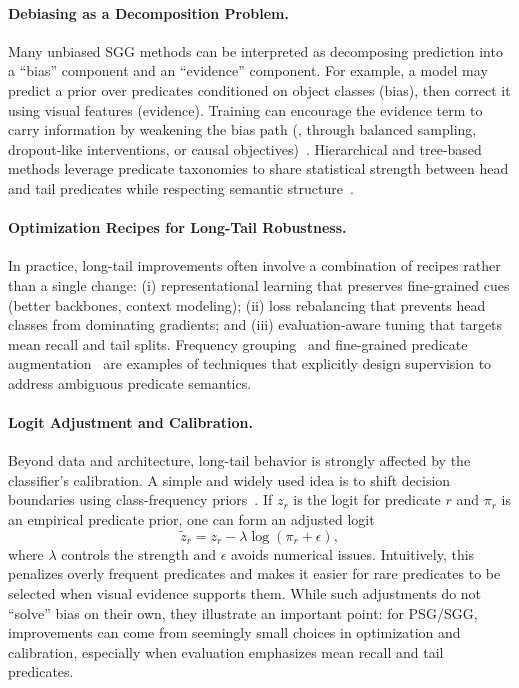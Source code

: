 \paragraph{Debiasing as a Decomposition Problem.}
Many unbiased SGG methods can be interpreted as decomposing prediction into a ``bias'' component and an ``evidence'' component. For example, a model may predict a prior over predicates conditioned on object classes (bias), then correct it using visual features (evidence). Training can encourage the evidence term to carry information by weakening the bias path (\eg, through balanced sampling, dropout-like interventions, or causal objectives)~\citep{tang2020unbiased, li2021bipartite}. Hierarchical and tree-based methods leverage predicate taxonomies to share statistical strength between head and tail predicates while respecting semantic structure~\citep{yu2020cogtree, deng2022hierarchical}.

\paragraph{Optimization Recipes for Long-Tail Robustness.}
In practice, long-tail improvements often involve a combination of recipes rather than a single change: (i) representational learning that preserves fine-grained cues (better backbones, context modeling); (ii) loss rebalancing that prevents head classes from dominating gradients; and (iii) evaluation-aware tuning that targets mean recall and tail splits. Frequency grouping~\citep{dong2022stacked} and fine-grained predicate augmentation~\citep{zhang2022fine} are examples of techniques that explicitly design supervision to address ambiguous predicate semantics.

\paragraph{Logit Adjustment and Calibration.}
Beyond data and architecture, long-tail behavior is strongly affected by the classifier's calibration. A simple and widely used idea is to shift decision boundaries using class-frequency priors~\citep{menon2021longtail}. If $z_r$ is the logit for predicate $r$ and $\pi_r$ is an empirical predicate prior, one can form an adjusted logit
\begin{equation}
\tilde z_r = z_r - \lambda \log(\pi_r + \epsilon),
\end{equation}
where $\lambda$ controls the strength and $\epsilon$ avoids numerical issues. Intuitively, this penalizes overly frequent predicates and makes it easier for rare predicates to be selected when visual evidence supports them. While such adjustments do not ``solve'' bias on their own, they illustrate an important point: for PSG/SGG, improvements can come from seemingly small choices in optimization and calibration, especially when evaluation emphasizes mean recall and tail predicates.


